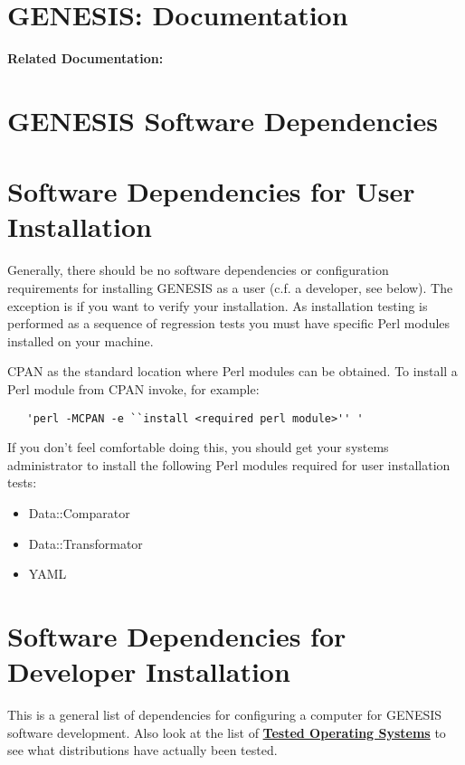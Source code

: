 \documentclass[12pt]{article}
\begin{document}
\section*{GENESIS: Documentation}

{\bf Related Documentation:}

\section*{GENESIS Software Dependencies}

\section*{Software Dependencies for User Installation}

Generally, there should be no software dependencies or configuration requirements for installing GENESIS as a user (c.f. a developer, see below). The exception is if you want to verify your installation. As installation testing is performed as a sequence of regression tests you must have specific Perl modules installed on your machine.

CPAN as the standard location where Perl modules can be obtained. To install a Perl module from CPAN invoke, for example: 
\begin{verbatim}
   'perl -MCPAN -e ``install <required perl module>'' '
\end{verbatim}

If you don't feel comfortable doing this, you should get your systems administrator to install the following Perl modules required for user installation tests: 

\begin{itemize}
   \item[]Data::Comparator
   \item[]Data::Transformator
   \item[]YAML
\end{itemize}

\section*{Software Dependencies for Developer Installation}

This is a general list of dependencies for configuring a computer for
GENESIS software development.  Also look at the list of \href{../tested-distributions/tested-distributions.tex}{\bf Tested Operating Systems} to see what distributions have actually
been tested.
\end{document}
